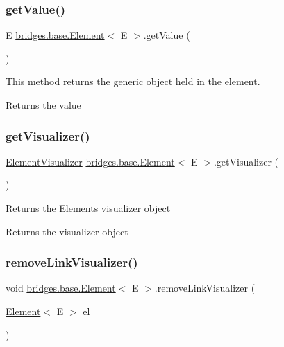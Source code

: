 \subsubsection{\texorpdfstring{get\+Value()}{getValue()}}
{\footnotesize\ttfamily E \hyperlink{classbridges_1_1base_1_1_element}{bridges.\+base.\+Element}$<$ E $>$.get\+Value (\begin{DoxyParamCaption}{ }\end{DoxyParamCaption})}

This method returns the generic object held in the element.

\begin{DoxyReturn}{Returns}
the value 
\end{DoxyReturn}
\mbox{\label{classbridges_1_1base_1_1_element_a42c84d41dfb7bd05a586e303cb33de72}} 
\subsubsection{\texorpdfstring{get\+Visualizer()}{getVisualizer()}}
{\footnotesize\ttfamily \hyperlink{classbridges_1_1base_1_1_element_visualizer}{Element\+Visualizer} \hyperlink{classbridges_1_1base_1_1_element}{bridges.\+base.\+Element}$<$ E $>$.get\+Visualizer (\begin{DoxyParamCaption}{ }\end{DoxyParamCaption})}

Returns the \hyperlink{classbridges_1_1base_1_1_element}{Element}\textquotesingle{}s visualizer object

\begin{DoxyReturn}{Returns}
the visualizer object 
\end{DoxyReturn}
\mbox{\label{classbridges_1_1base_1_1_element_a144cd54e043a801fab326769a5da01e2}} 
\subsubsection{\texorpdfstring{remove\+Link\+Visualizer()}{removeLinkVisualizer()}}
{\footnotesize\ttfamily void \hyperlink{classbridges_1_1base_1_1_element}{bridges.\+base.\+Element}$<$ E $>$.remove\+Link\+Visualizer (\begin{DoxyParamCaption}\item[{\hyperlink{classbridges_1_1base_1_1_element}{Element}$<$ E $>$}]{el }\end{DoxyParamCaption})\hspace{0.3cm}{\ttfamily [protected]}}



